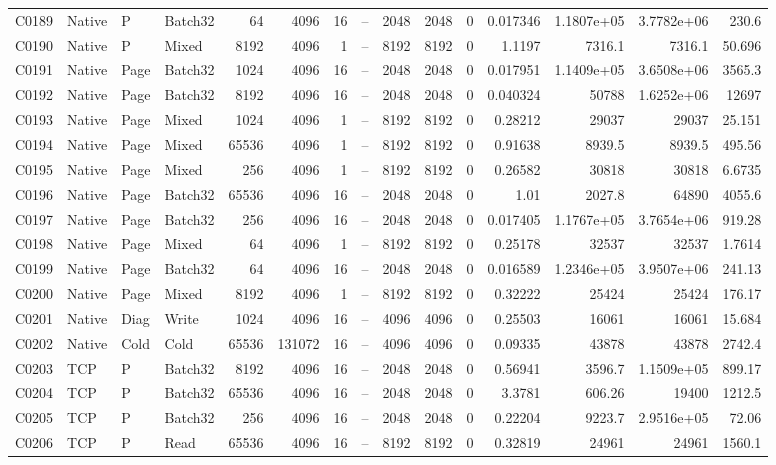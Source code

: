 \begin{landscape}
\begin{longtable}{llllrrrrrrrrrrr}
C0189 & Native & P & Batch32 & 64 & 4096 & 16 & -- & 2048 & 2048 & 0 & 0.017346 & 1.1807e+05 & 3.7782e+06 & 230.6\\
C0190 & Native & P & Mixed & 8192 & 4096 & 1 & -- & 8192 & 8192 & 0 & 1.1197 & 7316.1 & 7316.1 & 50.696\\
C0191 & Native & Page & Batch32 & 1024 & 4096 & 16 & -- & 2048 & 2048 & 0 & 0.017951 & 1.1409e+05 & 3.6508e+06 & 3565.3\\
C0192 & Native & Page & Batch32 & 8192 & 4096 & 16 & -- & 2048 & 2048 & 0 & 0.040324 & 50788 & 1.6252e+06 & 12697\\
C0193 & Native & Page & Mixed & 1024 & 4096 & 1 & -- & 8192 & 8192 & 0 & 0.28212 & 29037 & 29037 & 25.151\\
C0194 & Native & Page & Mixed & 65536 & 4096 & 1 & -- & 8192 & 8192 & 0 & 0.91638 & 8939.5 & 8939.5 & 495.56\\
C0195 & Native & Page & Mixed & 256 & 4096 & 1 & -- & 8192 & 8192 & 0 & 0.26582 & 30818 & 30818 & 6.6735\\
C0196 & Native & Page & Batch32 & 65536 & 4096 & 16 & -- & 2048 & 2048 & 0 & 1.01 & 2027.8 & 64890 & 4055.6\\
C0197 & Native & Page & Batch32 & 256 & 4096 & 16 & -- & 2048 & 2048 & 0 & 0.017405 & 1.1767e+05 & 3.7654e+06 & 919.28\\
C0198 & Native & Page & Mixed & 64 & 4096 & 1 & -- & 8192 & 8192 & 0 & 0.25178 & 32537 & 32537 & 1.7614\\
C0199 & Native & Page & Batch32 & 64 & 4096 & 16 & -- & 2048 & 2048 & 0 & 0.016589 & 1.2346e+05 & 3.9507e+06 & 241.13\\
C0200 & Native & Page & Mixed & 8192 & 4096 & 1 & -- & 8192 & 8192 & 0 & 0.32222 & 25424 & 25424 & 176.17\\
C0201 & Native & Diag & Write & 1024 & 4096 & 16 & -- & 4096 & 4096 & 0 & 0.25503 & 16061 & 16061 & 15.684\\
C0202 & Native & Cold & Cold & 65536 & 131072 & 16 & -- & 4096 & 4096 & 0 & 0.09335 & 43878 & 43878 & 2742.4\\
C0203 & TCP & P & Batch32 & 8192 & 4096 & 16 & -- & 2048 & 2048 & 0 & 0.56941 & 3596.7 & 1.1509e+05 & 899.17\\
C0204 & TCP & P & Batch32 & 65536 & 4096 & 16 & -- & 2048 & 2048 & 0 & 3.3781 & 606.26 & 19400 & 1212.5\\
C0205 & TCP & P & Batch32 & 256 & 4096 & 16 & -- & 2048 & 2048 & 0 & 0.22204 & 9223.7 & 2.9516e+05 & 72.06\\
C0206 & TCP & P & Read & 65536 & 4096 & 16 & -- & 8192 & 8192 & 0 & 0.32819 & 24961 & 24961 & 1560.1\\

\end{longtable}
\end{landscape}
